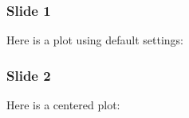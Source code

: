 \begin{frame}[fragile]
\frametitle{Slide 1}


Here is a plot using default settings:

\noindent{}
\end{frame}

\begin{frame}[fragile]
\frametitle{Slide 2}


Here is a centered plot:

\noindent{}
\end{frame}

